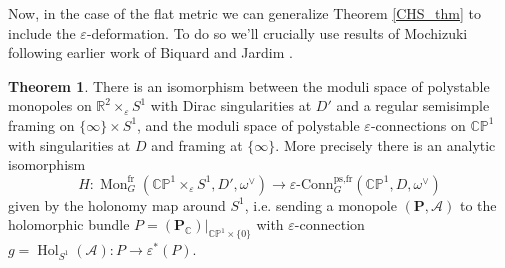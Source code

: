 \documentclass[11pt, oneside, reqno]{amsart}
\theoremstyle{definition} \newtheorem{definition}{Definition}[section]
\newtheorem{theorem}[definition]{Theorem}
\theoremstyle{definition} \newtheorem{remark}[definition]{Remark}
\theoremstyle{definition} \newtheorem{remarks}[definition]{Remarks}
\theoremstyle{definition} \newtheorem{question}[definition]{Question}
\theoremstyle{definition} \newtheorem*{note}{Note}
\theoremstyle{definition} \newtheorem{example}[definition]{Example}
\theoremstyle{definition} \newtheorem{examples}[definition]{Examples}
\newcommand{\bb}[1]{\mathbb{#1}}
\newcommand{\mc}[1]{\mathcal{#1}}
\newcommand{\bo}[1]{\boldsymbol{#1}}
\newcommand{\CC}{\mathbb{C}}
\newcommand{\RR}{\mathbb{R}}
\newcommand{\eps}{\varepsilon}
\DeclareMathOperator{\mon}{Mon}
\DeclareMathOperator{\Hol}{Hol}
\newcommand{\epsconn}{\varepsilon\text{-Conn}}
\newcommand{\fr}{\mathrm{fr}}
\begin{document}
Now, in the case of the flat metric we can generalize Theorem \ref{CHS_thm} to include the $\eps$-deformation.  To do so we'll crucially use results of Mochizuki \cite{MochizukiKH} following earlier work of Biquard and Jardim \cite{BiquardJardim}.

\begin{theorem} \label{monopole_qconn_comparison_thm}
There is an isomorphism between the moduli space of polystable monopoles on $\RR^2 \times_\eps S^1$ with Dirac singularities at $D'$ and a regular semisimple framing on $\{\infty\} \times S^1$, and the moduli space of polystable $\eps$-connections on $\bb{CP}^1$ with singularities at $D$ and framing at $\{\infty\}$.  More precisely there is an analytic isomorphism
\[H \colon \mon^{\fr}_G(\bb{CP}^1 \times_\eps S^1, D', \omega^\vee) \to \epsconn_G^{\text{ps,fr}}(\bb{CP}^1, D, \omega^\vee)\]
given by the holonomy map around $S^1$, i.e. sending a monopole $(\bo P, \mc A)$ to the holomorphic bundle $P = (\bo P_\CC)|_{\bb{CP}^1 \times \{0\}}$ with $\eps$-connection $g = \Hol_{S^1}(\mc A) \colon P \to \eps^*(P)$.
\end{theorem}
\end{document}
